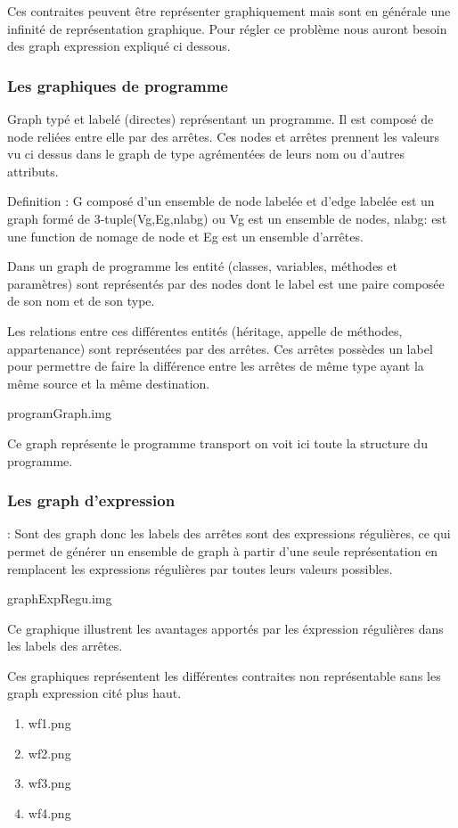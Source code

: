 \documentclass[a4paper, 10pt]{article}
\begin{document}
Ces contraites peuvent être représenter graphiquement mais sont en générale une infinité de représentation graphique.
Pour régler ce problème nous auront besoin des graph expression expliqué ci dessous.

\subsubsection{Les graphiques de programme} Graph typé et labelé (directes) représentant un programme. Il est composé de node reliées entre elle par des arrêtes. Ces nodes et arrêtes prennent les valeurs vu ci dessus dans le graph de type agrémentées de leurs nom ou d'autres attributs.

Definition : G composé d'un ensemble de node labelée et d'edge labelée est un graph formé de 3-tuple(Vg,Eg,nlabg) ou Vg est un ensemble de nodes, nlabg: est une function de nomage de node et Eg est un ensemble
d'arrêtes.

Dans un graph de programme les entité (classes, variables, méthodes et paramètres) sont représentés par des nodes dont le label est une paire composée de son nom et de son type.

Les relations entre ces différentes entités (héritage, appelle de méthodes, appartenance) sont représentées par des arrêtes. 
Ces arrêtes possèdes un label pour permettre de faire la différence entre les arrêtes de même type ayant la même source et la même destination.

programGraph.img

Ce graph représente le programme transport on voit ici toute la structure du programme.

\subsubsection{Les graph d'expression} : Sont des graph donc les labels des arrêtes sont des expressions régulières, ce qui permet de générer un ensemble de graph à partir d'une seule représentation en remplacent les expressions régulières par toutes leurs valeurs possibles.

graphExpRegu.img

Ce graphique illustrent les avantages apportés par les éxpression régulières dans les labels des arrêtes.

Ces graphiques représentent les différentes contraites non représentable sans les graph expression cité plus haut.

\begin{enumerate}
\item wf1.png
\item wf2.png
\item wf3.png
\item wf4.png
\end{enumerate}
\end{document}
